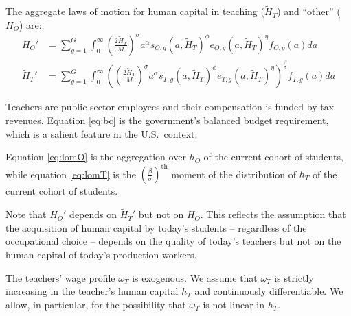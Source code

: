 \documentclass[onehalfspacing,11pt]{article}
\begin{document}
	The aggregate laws of motion for human capital in teaching ($\widetilde{H}_T$) and ``other'' (${H}_O$) are:
	\begin{align}
		\label{eq:lomO}
		{H}_{O}' & = \sum_{g=1}^G \int_0^\infty \left(\tfrac{2 \widetilde{H}_T}{M}\right)^\sigma a^\alpha s_{O,g}\left(a,\widetilde{H}_T\right)^\phi e_{O,g}(a,\widetilde{H}_T)^\eta  f_{O,g}(a) da \\
		\label{eq:lomT}
		\widetilde{H}_{T}' & = \sum_{g=1}^G \int_0^\infty \left(\left(\tfrac{2 \widetilde{H}_T}{M}\right)^\sigma a^\alpha s_{T,g}\left(a,\widetilde{H}_T\right)^\phi e_{T,g}(a,\widetilde{H}_T)^\eta \right)^{\frac{\beta}{\sigma}} f_{T,g}(a) da 
	\end{align}
	
	Teachers are public sector employees and their compensation is funded by tax revenues. Equation \eqref{eq:bc} is the government's balanced budget requirement, which is a salient feature in the U.S.~context. 
	
	Equation \eqref{eq:lomO} is the aggregation over $h_O$ of the current cohort of students, while equation \eqref{eq:lomT} is the ${\left( \tfrac{\beta}{\sigma} \right)}^{\textrm{th}}$ moment of the distribution of $h_T$ of the current cohort of students.
	
	Note that ${H}_{O}'$ depends on $\widetilde{H}_{T}' $ but not on ${H}_{O}$. This reflects the assumption that the acquisition of human capital by today's students -- regardless of the occupational choice -- depends on the quality of today's teachers but not on the human capital of today's production workers.
	
	The teachers' wage profile $\omega_T$ is exogenous. We assume that $\omega_T$ is strictly increasing in the teacher's human capital $h_T$ and continuously differentiable. We allow, in particular, for the possibility that $\omega_T$ is not linear in $h_T$.%
	
\end{document}
